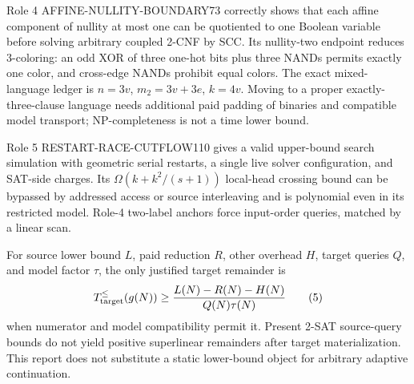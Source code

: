 \documentclass[11pt]{article}
\begin{document}
Role 4 AFFINE-NULLITY-BOUNDARY73 correctly shows that each affine component of nullity at most one can be quotiented to one Boolean variable before solving arbitrary coupled 2-CNF by SCC. Its nullity-two endpoint reduces 3-coloring: an odd XOR of three one-hot bits plus three NANDs permits exactly one color, and cross-edge NANDs prohibit equal colors. The exact mixed-language ledger is $n=3v$, $m_2=3v+3e$, $k=4v$. Moving to a proper exactly-three-clause language needs additional paid padding of binaries and compatible model transport; NP-completeness is not a time lower bound.

Role 5 RESTART-RACE-CUTFLOW110 gives a valid upper-bound search simulation with geometric serial restarts, a single live solver configuration, and SAT-side charges. Its $\Omega(k+k^2/(s+1))$ local-head crossing bound can be bypassed by addressed access or source interleaving and is polynomial even in its restricted model. Role-4 two-label anchors force input-order queries, matched by a linear scan.

For source lower bound $L$, paid reduction $R$, other overhead $H$, target queries $Q$, and model factor $\tau$, the only justified target remainder is
\[
T_{\rm target}^{\le}(g(N))
\ge\frac{L(N)-R(N)-H(N)}{Q(N)\tau(N)}
\tag{5}
\]
when numerator and model compatibility permit it. Present 2-SAT source-query bounds do not yield positive superlinear remainders after target materialization. This report does not substitute a static lower-bound object for arbitrary adaptive continuation.
\end{document}
